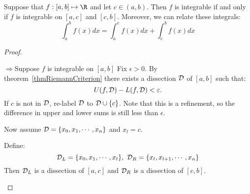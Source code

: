 \documentclass[../Main.tex]{subfiles}
\begin{document}
\begin{theorem}
    Suppose that $f : [a, b] \mapsto \R$ and let $c \in (a, b)$. Then $f$ is integrable if and only if $f$ is integrable on $[a, c]$ and $[c, b]$. Moreover, we can relate these integrals:
    \begin{equation*}
        \int_a^b f(x) dx = \int_a^c f(x) dx + \int_c^b f(x) dx
    \end{equation*}
    \label{thmIntegralSplitDomain}
\end{theorem}
\begin{proof}
    \begin{proofdirection}{$\Rightarrow$}{Suppose $f$ is integrable on $[a, b]$}
        Fix $\epsilon > 0$. By theorem~\ref{thmRiemannCriterion} there exists a dissection $\mathcal{D}$ of $[a, b]$ such that:
        \begin{equation*}
            U(f, \mathcal{D}) - L(f, \mathcal{D}) < \varepsilon.
        \end{equation*}
        If $c$ is not in $\mathcal{D}$, re-label $\mathcal{D}$ to $\mathcal{D} \cup \{c\}$. Note that this is a refinement, so the difference in upper and lower sums is still less than $\epsilon$.

        Now assume $\mathcal{D} = \{x_0, x_1, \cdots, x_n\}$ and $x_l = c$.

        Define:
        \begin{equation*}
            \mathcal{D}_L = \{x_0, x_1, \cdots, x_l\},~\mathcal{D}_R = \{x_l, x_{l + 1}, \cdots, x_n\}
        \end{equation*}
        Then $\mathcal{D}_L$ is a dissection of $[a, c]$ and $\mathcal{D}_R$ is a dissection of $[c, b]$.


\end{proofdirection}
\end{proof}
\end{document}
